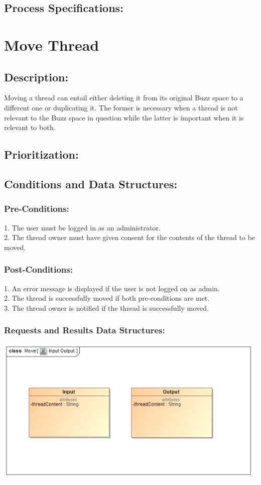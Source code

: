 \documentclass[a4paper,11pt]{article}
\begin{document}
\subsection{Process Specifications:}

\section{Move Thread}
\subsection*{Description:}
Moving a thread can entail either deleting it from its original Buzz space to a different one or duplicating it. The former is necessary when a thread is not relevant to the Buzz space in question while the latter is important when it is relevant to both.\\
\subsection{Prioritization:} 
\subsection{Conditions and Data Structures:}
\subsubsection*{Pre-Conditions:}
1.	The user must be logged in as an administrator.\\
2.	The thread owner must have given consent for the contents of the thread to be moved.\\
\subsubsection*{Post-Conditions:}
1.	An error message is displayed if the user is not logged on as admin.\\
2.	The thread is successfully moved if both pre-conditions are met.\\
3.	The thread owner is notified if the thread is successfully moved.\\
\subsubsection*{Requests and Results Data Structures:}
\includegraphics{Images/SCHMThread/MoveInOut.jpg}\\
\end{document}

